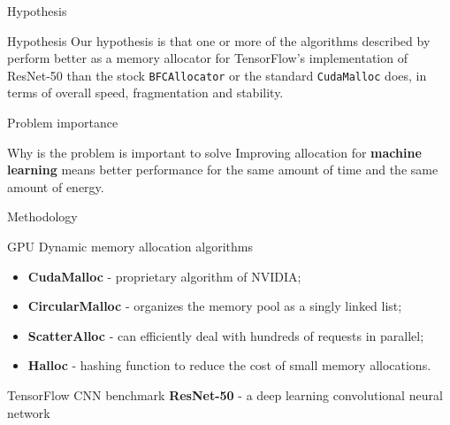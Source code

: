 \documentclass[10pt]{beamer}
\begin{document}
\begin{frame}[fragile]{Hypothesis}


\begin{alertblock}{Hypothesis}
Our hypothesis is that one or more of the algorithms described by \citeauthor{Vinkler2015} perform better as a memory allocator for TensorFlow's implementation of ResNet-50 than the stock \texttt{BFCAllocator} or the standard \texttt{CudaMalloc} does, in terms of overall speed, fragmentation and stability.
\end{alertblock}
\end{frame}

\begin{frame}[fragile]{Problem importance}


\begin{exampleblock}{Why is the problem is important to solve}
Improving allocation for \textbf{machine learning} means better performance for the same amount of time and the same amount of energy. 
\end{exampleblock}

\end{frame}

\begin{frame}[fragile]{Methodology}


\begin{alertblock}{GPU Dynamic memory allocation algorithms}
 \begin{itemize}
     \item \textbf{CudaMalloc} - proprietary algorithm of NVIDIA;
     \item \textbf{CircularMalloc} - organizes the memory pool as a singly linked list;
     \item \textbf{ScatterAlloc} - can efficiently deal with hundreds of requests in parallel;
     \item \textbf{Halloc} - hashing function to reduce the cost of small memory allocations.
 \end{itemize}
\end{alertblock}

\begin{exampleblock}{TensorFlow CNN benchmark}
    \textbf{ResNet-50} - a deep learning convolutional neural network
\end{exampleblock}

\end{frame}
\end{document}
